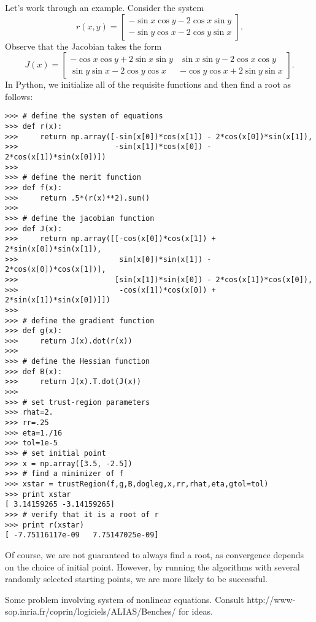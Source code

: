 Let's work through an example. Consider the system
\[
r(x,y) = \begin{bmatrix}
-\sin x\cos y - 2\cos x\sin y\\
-\sin y\cos x - 2\cos y\sin x
\end{bmatrix}.
\]
Observe that the Jacobian takes the form
\[
J(x) = \begin{bmatrix}
-\cos x\cos y + 2\sin x\sin y & \sin x\sin y - 2\cos x\cos y\\
\sin y\sin x - 2\cos y\cos x & -\cos y\cos x + 2\sin y \sin x
\end{bmatrix}.
\]
In Python, we initialize all of the requisite functions and then find a root as follows:
\begin{lstlisting}
>>> # define the system of equations
>>> def r(x):
>>>     return np.array([-sin(x[0])*cos(x[1]) - 2*cos(x[0])*sin(x[1]),
>>>                      -sin(x[1])*cos(x[0]) - 2*cos(x[1])*sin(x[0])])
>>>
>>> # define the merit function
>>> def f(x):
>>>     return .5*(r(x)**2).sum()
>>>
>>> # define the jacobian function
>>> def J(x):
>>>     return np.array([[-cos(x[0])*cos(x[1]) + 2*sin(x[0])*sin(x[1]),
>>>                       sin(x[0])*sin(x[1]) - 2*cos(x[0])*cos(x[1])],
>>>                      [sin(x[1])*sin(x[0]) - 2*cos(x[1])*cos(x[0]),
>>>                       -cos(x[1])*cos(x[0]) + 2*sin(x[1])*sin(x[0])]])
>>>
>>> # define the gradient function
>>> def g(x):
>>>     return J(x).dot(r(x))
>>>
>>> # define the Hessian function
>>> def B(x):
>>>     return J(x).T.dot(J(x))
>>>
>>> # set trust-region parameters
>>> rhat=2.
>>> rr=.25
>>> eta=1./16
>>> tol=1e-5
>>> # set initial point
>>> x = np.array([3.5, -2.5])
>>> # find a minimizer of f
>>> xstar = trustRegion(f,g,B,dogleg,x,rr,rhat,eta,gtol=tol)
>>> print xstar
[ 3.14159265 -3.14159265]
>>> # verify that it is a root of r
>>> print r(xstar)
[ -7.75116117e-09   7.75147025e-09]
\end{lstlisting}

Of course, we are not guaranteed to always find a root, as convergence depends on the choice of initial point.
However, by running the algorithms with several randomly selected starting points, we are more likely to 
be successful.

\begin{problem}
Some problem involving system of nonlinear equations. Consult http://www-sop.inria.fr/coprin/logiciels/ALIAS/Benches/ 
for ideas.
\end{problem}
